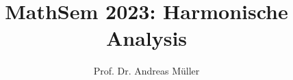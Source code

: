 %
%
%


\beamertemplatenavigationsymbolsempty
\title[MathSem]{MathSem 2023: Harmonische Analysis}
\author[A.~Müller]{Prof. Dr. Andreas Müller}
\date[]{}

